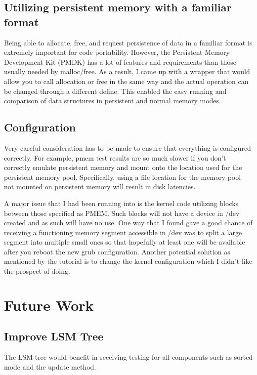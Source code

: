 \documentclass[twocolumn]{article}
\begin{document}
\subsection{Utilizing persistent memory with a familiar format}

Being able to allocate, free, and request persistence of data in a familiar
format is extremely important for code portability. However, the Persistent
Memory Development Kit (PMDK) has a lot of features and requirements than those
usually needed by malloc/free. As a result, I came up with a wrapper that would
allow you to call allocation or free in the same way and the actual operation
can be changed through a different define. This enabled the easy running and
comparison of data structures in persistent and normal memory modes.

\subsection{Configuration}

Very careful consideration has to be made to ensure that everything is
configured correctly. For example, pmem test results are so much slower if you
don't correctly emulate persistent memory and mount onto the location used for
the persistent memory pool. Specifically, using a file location for the memory
pool not mounted on persistent memory will result in disk latencies.

A major issue that I had been running into is the kernel code utilizing blocks
between those specified as PMEM. Such blocks will not have a device in
/dev created and as such will have no use. One way that I found gave a good
chance of receiving a functioning memory segment accessible in /dev was to split
a large segment into multiple small ones so that hopefully at least one will be
available after you reboot the new grub configuration. Another potential
solution as mentioned by the tutorial is to change the kernel configuration
which I didn't like the prospect of doing.

\section{Future Work}

\subsection{Improve LSM Tree}

The LSM tree would benefit in receiving testing for all components such as
sorted mode and the update method.
\end{document}
